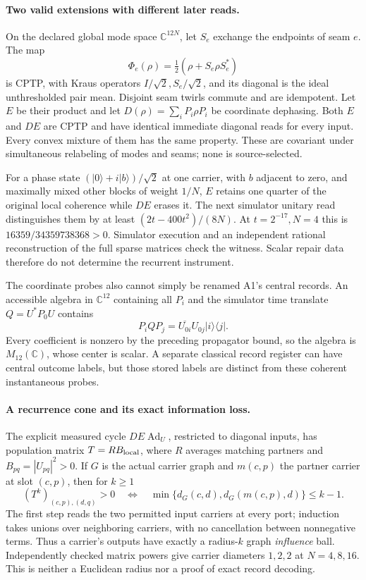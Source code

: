 \paragraph{Two valid extensions with different later reads.}
On the declared global mode space $\mathbb C^{12N}$, let $S_e$ exchange
the endpoints of seam $e$. The map
\[
 \Phi_e(\rho)=\tfrac12(\rho+S_e\rho S_e^*)
\]
is CPTP, with Kraus operators $I/\sqrt2,S_e/\sqrt2$, and its diagonal is
the ideal unthresholded pair mean. Disjoint seam twirls commute and are
idempotent. Let $E$ be their product and let
$D(\rho)=\sum_iP_i\rho P_i$ be coordinate dephasing. Both $E$ and $DE$
are CPTP and have identical immediate diagonal reads for every input.
Every convex mixture of them has the same property. These are covariant
under simultaneous relabeling of modes and seams; none is source-selected.

For a phase state $(|0\rangle+i|b\rangle)/\sqrt2$ at one carrier, with
$b$ adjacent to zero, and maximally mixed other blocks of weight $1/N$,
$E$ retains one quarter of the original local coherence while $DE$
erases it. The next simulator unitary read distinguishes them by at least
$(2t-400t^2)/(8N)$. At $t=2^{-17},N=4$ this is
$16359/34359738368>0$. Simulator execution and an independent rational
reconstruction of the full sparse matrices check the witness. Scalar
repair data therefore do not determine the recurrent instrument.

The coordinate probes also cannot simply be renamed A1's central records.
An accessible algebra in $\mathbb C^{12}$ containing all $P_i$ and the
simulator time translate $Q=U^*P_0U$ contains
\[
 P_iQP_j=\overline{U_{0i}}U_{0j}|i\rangle\langle j|.
\]
Every coefficient is nonzero by the preceding propagator bound, so the
algebra is $M_{12}(\mathbb C)$, whose center is scalar. A separate classical
record register can have central outcome labels, but those stored labels
are distinct from these coherent instantaneous probes.

\paragraph{A recurrence cone and its exact information loss.}
The explicit measured cycle $DE\operatorname{Ad}_U$, restricted to
diagonal inputs, has population matrix $T=RB_{\rm local}$, where $R$
averages matching partners and $B_{pq}=|U_{pq}|^2>0$. If $G$ is the
actual carrier graph and $m(c,p)$ the partner carrier at slot $(c,p)$,
then for $k\geq1$
\[
 (T^k)_{(c,p),(d,q)}>0
 \quad\Longleftrightarrow\quad
 \min\{d_G(c,d),d_G(m(c,p),d)\}\leq k-1.
\]
The first step reads the two permitted input carriers at every port;
induction takes unions over neighboring carriers, with no cancellation
between nonnegative terms. Thus a carrier's outputs have exactly a
radius-$k$ graph \emph{influence} ball. Independently checked matrix powers
give carrier diameters $1,2,2$ at $N=4,8,16$. This is neither a Euclidean
radius nor a proof of exact record decoding.

